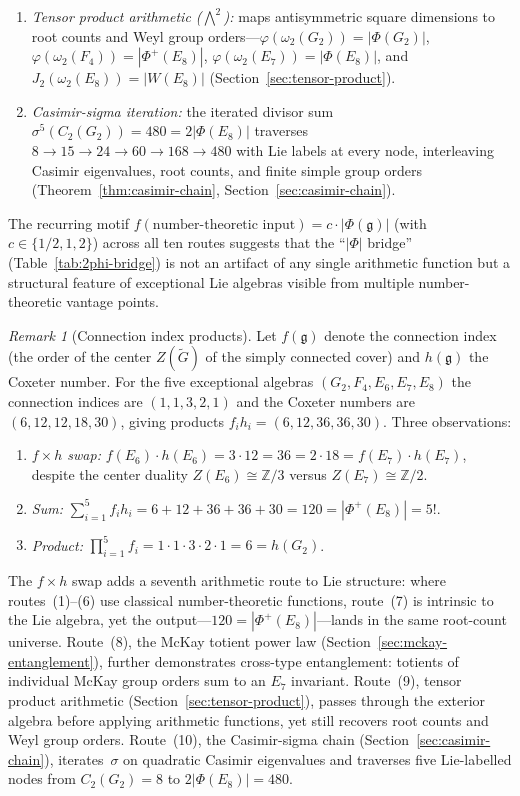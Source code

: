 \documentclass[11pt]{amsart}
\theoremstyle{plain}
\theoremstyle{definition}
\theoremstyle{remark}
\newtheorem{remark}[theorem]{Remark}
\newcommand{\fg}{\mathfrak{g}}
\renewcommand{\Phi}{\varPhi}
\begin{document}
\begin{enumerate}
  \item \emph{Tensor product arithmetic ($\bigwedge^2$):}
    maps antisymmetric square dimensions to root counts and Weyl group
    orders---$\varphi(\omega_2(G_2)) = |\Phi(G_2)|$,
    $\varphi(\omega_2(F_4)) = |\Phi^+(E_8)|$,
    $\varphi(\omega_2(E_7)) = |\Phi(E_8)|$, and
    $J_2(\omega_2(E_8)) = |W(E_8)|$
    (Section~\ref{sec:tensor-product}).
  \item \emph{Casimir-sigma iteration:} the iterated divisor sum
    $\sigma^5(C_2(G_2)) = 480 = 2|\Phi(E_8)|$ traverses
    $8 \to 15 \to 24 \to 60 \to 168 \to 480$ with Lie labels at
    every node, interleaving Casimir eigenvalues, root counts, and
    finite simple group orders
    (Theorem~\ref{thm:casimir-chain},
    Section~\ref{sec:casimir-chain}).
\end{enumerate}
The recurring motif $f(\text{number-theoretic input})
= c \cdot |\Phi(\fg)|$ (with $c \in \{1/2, 1, 2\}$) across all ten
routes suggests that the ``$|\Phi|$ bridge''
(Table~\ref{tab:2phi-bridge}) is not an artifact of any single
arithmetic function but a structural feature of exceptional Lie
algebras visible from multiple number-theoretic vantage points.

\begin{remark}[Connection index products]\label{rem:connection-index}
Let $f(\fg)$ denote the connection index (the order of the center
$Z(\widetilde{G})$ of the simply connected cover) and $h(\fg)$ the
Coxeter number.  For the five exceptional algebras
$(G_2, F_4, E_6, E_7, E_8)$ the connection indices are
$(1, 1, 3, 2, 1)$ and the Coxeter numbers are $(6, 12, 12, 18, 30)$,
giving products $f_i h_i = (6, 12, 36, 36, 30)$.  Three observations:
\begin{enumerate}
  \item \emph{$f \times h$ swap:}
    $f(E_6) \cdot h(E_6) = 3 \cdot 12 = 36 = 2 \cdot 18
    = f(E_7) \cdot h(E_7)$,
    despite the center duality $Z(E_6) \cong \mathbb{Z}/3$ versus
    $Z(E_7) \cong \mathbb{Z}/2$.
  \item \emph{Sum:}
    $\sum_{i=1}^{5} f_i h_i = 6 + 12 + 36 + 36 + 30
    = 120 = |\Phi^+(E_8)| = 5!$.
  \item \emph{Product:}
    $\prod_{i=1}^{5} f_i = 1 \cdot 1 \cdot 3 \cdot 2 \cdot 1
    = 6 = h(G_2)$.
\end{enumerate}
The $f \times h$ swap adds a seventh arithmetic route to Lie
structure: where routes~(1)--(6) use classical number-theoretic
functions, route~(7) is intrinsic to the Lie algebra, yet the
output---$120 = |\Phi^+(E_8)|$---lands in the same root-count
universe.  Route~(8), the McKay totient power law
(Section~\ref{sec:mckay-entanglement}), further demonstrates
cross-type entanglement: totients of individual McKay group orders
sum to an $E_7$ invariant.  Route~(9), tensor product arithmetic
(Section~\ref{sec:tensor-product}), passes through the exterior
algebra before applying arithmetic functions, yet still recovers
root counts and Weyl group orders.  Route~(10), the Casimir-sigma
chain (Section~\ref{sec:casimir-chain}), iterates~$\sigma$ on
quadratic Casimir eigenvalues and traverses five Lie-labelled nodes
from $C_2(G_2) = 8$ to $2|\Phi(E_8)| = 480$.
\end{remark}
\end{document}
